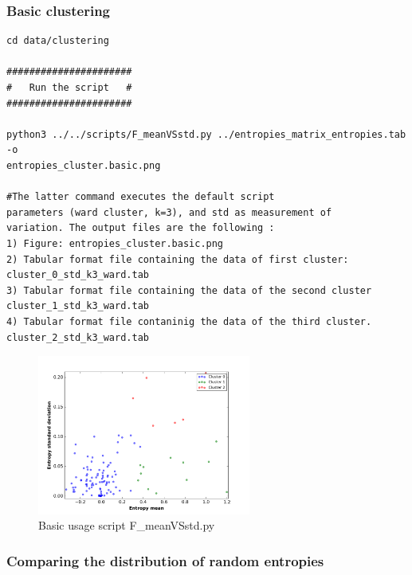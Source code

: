 \documentclass[12pt]{report}
\begin{document}
\subsubsection{Basic clustering}
\begin{verbatim}
cd data/clustering

######################
#   Run the script   #
######################

python3 ../../scripts/F_meanVSstd.py ../entropies_matrix_entropies.tab -o 
entropies_cluster.basic.png

#The latter command executes the default script 
parameters (ward cluster, k=3), and std as measurement of 
variation. The output files are the following :
1) Figure: entropies_cluster.basic.png
2) Tabular format file containing the data of first cluster: 
cluster_0_std_k3_ward.tab
3) Tabular format file containing the data of the second cluster 
cluster_1_std_k3_ward.tab
4) Tabular format file contaninig the data of the third cluster. 
cluster_2_std_k3_ward.tab
\end{verbatim}
\begin{figure}[H]
  \centering
    \includegraphics[width=70mm, scale=1]{entropies_cluster_basic.png}
    \caption{Basic usage script F\_meanVSstd.py}
        \label{fig:cluster_basic}
\end{figure}

\subsubsection{Comparing  the distribution of random entropies}
\end{document}

